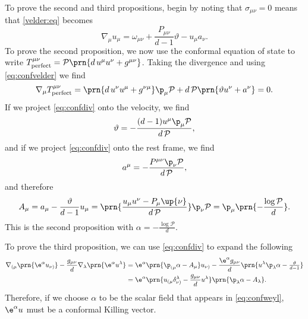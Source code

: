 \documentclass[12pt]{article}
\newcommand{\ploc}{\mathcal{P}}
\newcommand{\perf}{_\text{perfect}}
\begin{document}
To prove the second and third propositions, begin by noting that \(\sigma_{\mu\nu} = 0\) means that \eqref{velder:eq} becomes
%
\begin{equation}\label{eq:confvelder}
  \nabla_\mu u_\mu = \omega_{\mu\nu} + \frac{P_{\mu\nu}}{d-1} \vartheta - u_\mu a_\nu.
\end{equation}
%
To prove the second proposition, we now use the conformal equation of state to write \( T^{\mu\nu}\perf = \ploc \prn{d\, u^\mu u^\nu + g^{\mu\nu}} \).
Taking the divergence and using \eqref{eq:confvelder} we find
%
\begin{equation}\label{eq:confdiv}
  \nabla_\mu T^{\mu\nu}\perf 
      = \prn{d\, u^\nu u^\mu + g^{\nu\mu}} \p_\mu \ploc
      + d\, \ploc \prn{\vartheta u^\nu + a^\nu}
      = 0.
\end{equation}
%
If we project \eqref{eq:confdiv} onto the velocity, we find
%
\begin{equation*}
  \vartheta = - \frac{(d-1) u^\mu \p_\mu \ploc}{d\, \ploc} ,
\end{equation*}
%
and if we project \eqref{eq:confdiv} onto the rest frame, we find
%
\begin{equation*}
  a^\mu = - \frac{P^{\mu\nu} \p_\nu \ploc}{d\, \ploc},
\end{equation*}
%
and therefore 
%
\begin{equation}\label{eq:confweyl}
  A_\mu = a_\mu - \frac{\vartheta}{d-1} u_\mu
      = \prn{\frac{u_\mu u^\nu - P_\mu\up{\nu}}{d\, \ploc }}  \p_\nu \ploc
      = \p_\mu \prn{-\frac{\log \ploc}{d}}.
\end{equation}
%
This is the second proposition with \(\alpha = -\frac{\log \ploc}{d}\).

To prove the third proposition, we can use  \eqref{eq:confdiv} to expand the following
%
\begin{equation}\label{eq:confckv}
\begin{aligned}
  \nabla_{(\mu} \prn{\e^\alpha u_{\nu)}} - \frac{g_{\mu\nu}}{d} \nabla_\lambda \prn{\e^\alpha u^\lambda} 
    &= \e^\alpha \prn{\p_{(\mu}\alpha - A_\mu } u_{\nu)}  - \frac{\e^\alpha g_{\mu\nu}}{d} \prn{u^\lambda \p_\lambda \alpha - \tfrac{\vartheta}{d-1}}
    \\
    &= \e^\alpha \prn{ u_{(\mu} \delta^\lambda_{\nu)}  - \frac{g_{\mu\nu}}{d} u^\lambda } \prn{\p_\lambda \alpha - A_\lambda}.
\end{aligned}
\end{equation}
%
Therefore, if we choose \(\alpha\) to be the scalar field that appears in \eqref{eq:confweyl}, \( \e^\alpha u \) must be a conformal Killing vector.
\end{document}
